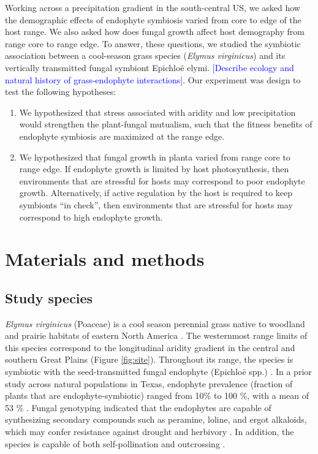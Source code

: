 \documentclass[12pt,english]{article}
\begin{document}
\begin{spacing}{1.9}
Working across a precipitation gradient in the south-central US, we asked how the demographic effects of endophyte symbiosis varied from core to edge of the host range.
We also asked how does fungal growth affect host demography from range core to range edge. 
To answer, these questions, we studied the symbiotic association between a cool-season grass species (\emph{Elymus virginicus}) and its vertically transmitted fungal symbiont Epichloë elymi. \textcolor{blue}{[Describe ecology and natural history of grass-endophyte interactions]}.
Our experiment was design to test the following hypotheses:
\begin{enumerate}
\item We hypothesized that stress associated with aridity and low precipitation would strengthen the plant-fungal mutualism, such that the fitness benefits of endophyte symbiosis are maximized at the range edge. 
\item We hypothesized that fungal growth in planta varied from range core to range edge. If endophyte growth is limited by host photosynthesis, then environments that are stressful for hosts may correspond to poor endophyte growth. Alternatively, if active regulation by the host is required to keep symbionts “in check”, then environments that are stressful for hosts may correspond to high endophyte growth.
\end{enumerate}

\section*{Materials and methods}

\subsection*{Study species}
\emph {Elymus virginicus} (Poaceae) is a cool season perennial grass native to woodland and prairie habitats of eastern North America \citep{shaw2011guide}. 
The westernmost range limits of this species correspond to the longitudinal aridity gradient in the central and southern Great Plains (Figure \ref{fig:site}). 
Throughout its range, the species is  symbiotic with the seed-transmitted fungal endophyte (Epichloë spp.) \citep{rudgers2009benefits}. 
In a prior study across natural populations in Texas, endophyte prevalence (fraction of plants that are endophyte-symbiotic) ranged from 10\% to 100 \%, with a mean of 53 \% \citep{sneck2017variation}. 
Fungal genotyping indicated that the endophytes are capable of synthesizing secondary compounds such as peramine, loline, and ergot alkaloids, which may confer resistance against drought and herbivory \citep{beaudry1951seed}.
In addition, the species is capable of both self-pollination and outcrossing \citep{church1958artificial}. 





\end{spacing}
\end{document}
